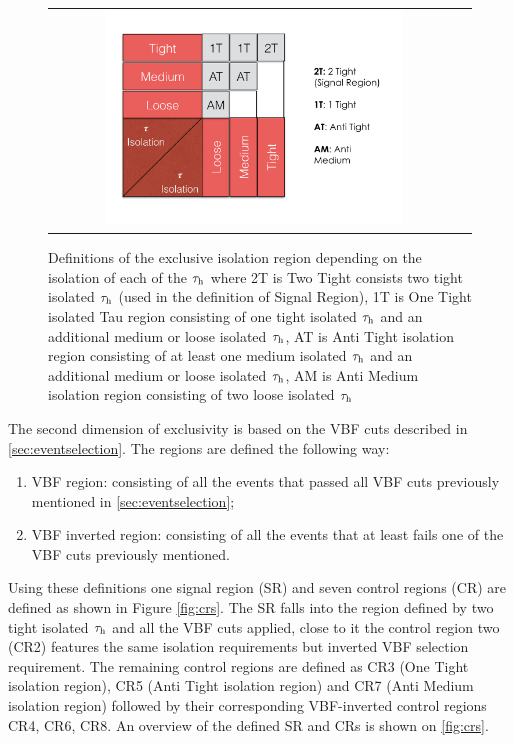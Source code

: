  	\begin{figure}[tbh!]
 		\centering
 		\begin{tabular}{cc}
 			\includegraphics[width=0.75\textwidth]{PLOTS/diTauHadLSotherPlots/tauisoregions.png}
 		\end{tabular}
 		\caption{Definitions of the exclusive isolation region depending on the isolation of each of the $\tau_{\text{h}}$ where 2T is Two Tight consists two tight isolated $\tau_{\text{h}}$ (used in the definition of Signal Region), 1T is One Tight isolated Tau region consisting of one tight isolated $\tau_{\text{h}}$ and an additional medium or loose isolated $\tau_{\text{h}}$, AT is Anti Tight isolation region consisting of at least one medium isolated $\tau_{\text{h}}$ and an additional medium or loose isolated $\tau_{\text{h}}$,  AM is Anti Medium isolation region consisting of two loose isolated $\tau_{\text{h}}$}
 		\label{fig:tauisoregions}
 	\end{figure}
 
The second dimension of exclusivity is based on the VBF cuts described in \ref{sec:eventselection}. The regions are defined the following way:
	
	\begin{enumerate}
		\item VBF region: consisting of all the events that passed all VBF cuts previously mentioned in \autoref{sec:eventselection};
		\item VBF inverted region: consisting of all the events that at least fails one of the VBF cuts previously mentioned.
	\end{enumerate} 

Using these definitions one signal region (SR) and seven control regions (CR) are defined as shown in Figure \ref{fig:crs}. The SR falls into the region defined by two tight isolated $\tau_{\text{h}}$ and all the VBF cuts applied, close to it the control region two (CR2) features the same \hadtau isolation requirements but inverted VBF selection requirement. The remaining control regions are defined as CR3 (One Tight isolation region), CR5  (Anti Tight isolation region) and CR7 (Anti Medium isolation region) followed by their corresponding VBF-inverted control regions CR4, CR6, CR8. An overview of the defined SR and CRs is shown on \autoref{fig:crs}.

